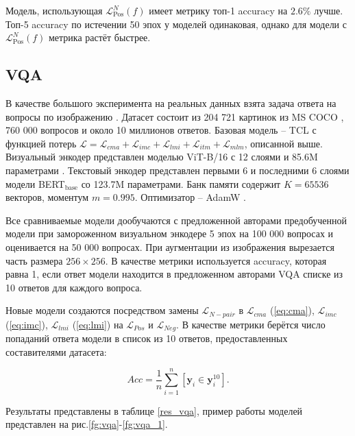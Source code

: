 \documentclass[a4paper, 14pt]{article}
\begin{document}
Модель, использующая $\mathcal{L}_{\text{Pos}}^N(f)$ имеет метрику топ-1 accuracy на $2.6\%$ лучше. Топ-5 accuracy по истечении 50 эпох у моделей одинаковая, однако для модели с $\mathcal{L}_{\text{Pos}}^N(f)$ метрика растёт быстрее.

\subsection{VQA}
В качестве большого эксперимента на реальных данных взята задача ответа на вопросы по изображению \citep{VQA}. Датасет состоит из 204 721 картинок из MS COCO \citep{lin2015microsoft}, 760 000 вопросов и около 10 миллионов ответов. Базовая модель -- TCL \citep{TCL} с функцией потерь $\mathcal{L} = \mathcal{L}_{cma} + \mathcal{L}_{imc} + \mathcal{L}_{lmi} + \mathcal{L}_{itm} + \mathcal{L}_{mlm}$, описанной выше. Визуальный энкодер представлен моделью ViT-B/16 с 12 слоями и 85.6M параметрами \citep{ViT}. Текстовый энкодер представлен первыми 6 и последними 6 слоями модели BERT$_{\text{base}}$ \citep{BERT} со 123.7M параметрами. Банк памяти содержит $K = 65536$ векторов, моментум $m = 0.995$. Оптимизатор -- AdamW \citep{AdamW}.

Все сравниваемые модели дообучаются с предложенной авторами \citep{TCL} предобученной модели при замороженном визуальном энкодере 5 эпох на 100 000 вопросах и оценивается на 50 000 вопросах. При аугментации из изображения вырезается часть размера $256 \times 256$. В качестве метрики используется accuracy, которая равна 1, если ответ модели находится в предложенном авторами VQA списке из 10 ответов для каждого вопроса.

Новые модели создаются посредством замены $\mathcal{L}_{N-pair}$ в $\mathcal{L}_{cma}$ (\ref{eq:cma}), $\mathcal{L}_{imc}$ (\ref{eq:imc}), $\mathcal{L}_{lmi}$ (\ref{eq:lmi}) на $\mathcal{L}_{Pos}$ и $\mathcal{L}_{Neg}$. В качестве метрики берётся число попаданий ответа модели в список из 10 ответов, предоставленных составителями датасета:

\[Acc = \frac{1}{n}\sum\limits_{i = 1}^n[\mathbf{y}_i \in \mathbf{y}_i^{10}].\]

Результаты представлены в таблице \ref{res_vqa}, пример работы моделей представлен на рис.\ref{fg:vqa}-\ref{fg:vqa_1}.
\end{document}
